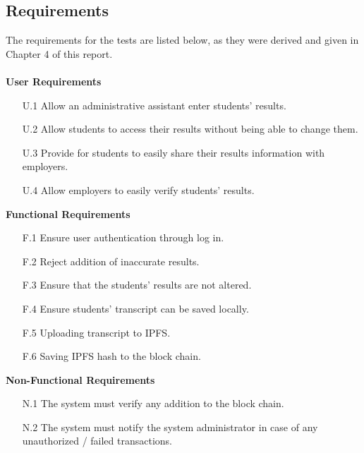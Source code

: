 \subsection{Requirements}
The requirements for the tests are listed below, as they were derived and given in Chapter 4 of this report.\\\\
\textbf{User Requirements}
\begin{enumerate}
\item[U.1] Allow an administrative assistant enter students’ results.
\item[U.2] Allow students to access their results without being able to change them.
\item[U.3] Provide for students to easily share their results information with employers.
\item[U.4] Allow employers to easily verify students' results.
\end{enumerate}
\textbf{Functional Requirements}
\begin{enumerate}
\item[F.1] Ensure user authentication through log in.
\item[F.2] Reject addition of inaccurate results.
\item[F.3] Ensure that the students’ results are not altered.
\item[F.4] Ensure students' transcript can be saved locally.
\item[F.5] Uploading transcript to IPFS.
\item[F.6] Saving IPFS hash to the block chain.
\end{enumerate}
\textbf{Non-Functional Requirements}
\begin{enumerate}
\item[N.1] The system must verify any addition to the block chain.
\item[N.2] The system must notify the system administrator in case of any unauthorized / failed transactions.
\end{enumerate}

